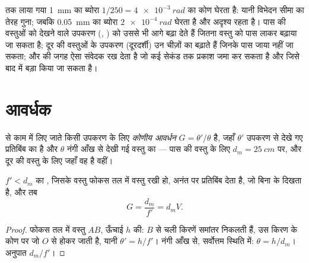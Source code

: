 \begin{remark}[उपकरण किसलिए है]\label{rem:b1:optical-instruments:purpose}
 तक लाया गया \qty{1}{mm} का ब्योरा $1/250 =
\qty{4e-3}{rad}$ का कोण घेरता है: यानी विभेदन सीमा का तेरह गुना; जबकि
\qty{0.05}{mm} का ब्योरा $\qty{2e-4}{rad}$ घेरता है और अदृश्य रहता है। पास की
वस्तुओं को देखने वाले उपकरण (, )  को उससे भी आगे
बढ़ा देते हैं जितना वस्तु को पास लाकर बढ़ाया जा सकता है; दूर की वस्तुओं के
उपकरण (दूरदर्शी) उन चीज़ों का  बढ़ाते हैं जिनके पास जाया नहीं जा सकता;
और   की जगह ऐसा संवेदक रख देता है जो कई सेकंड तक प्रकाश जमा कर
सकता है और जिसे बाद में बड़ा किया जा सकता है।
\end{remark}

\section{आवर्धक}

\begin{definition}[कोणीय आवर्धन]\label{def:b1:optical-instruments:G}
 से काम में लिए जाते किसी उपकरण के लिए \emph{कोणीय आवर्धन}
$G = \theta'/\theta$ है, जहाँ $\theta'$ उपकरण से देखे गए प्रतिबिंब का  है और $\theta$ नंगी आँख से देखी गई वस्तु का  --- पास की वस्तु
के लिए  $d_m = \qty{25}{cm}$ पर, और दूर की वस्तु के लिए जहाँ वह है
वहीं।
\end{definition}

\begin{proposition}[आवर्धक]\label{prop:b1:optical-instruments:loupe}
 $f' < d_m$ का , जिसके वस्तु फोकस तल में वस्तु रखी हो,
अनंत पर प्रतिबिंब देता है, जो बिना  के दिखता है, और तब
\[
G = \frac{d_m}{f'} = d_m V .
\]
\end{proposition}

\begin{proof}
फोकस तल में वस्तु $AB$, ऊँचाई $h$ की: $B$ से चली किरणें समांतर निकलती हैं, उस
किरण के कोण पर जो $O$ से होकर जाती है, यानी $\theta' = h/f'$। नंगी आँख से,
सर्वोत्तम स्थिति में: $\theta = h/d_m$। अनुपात $d_m/f'$।
\end{proof}


